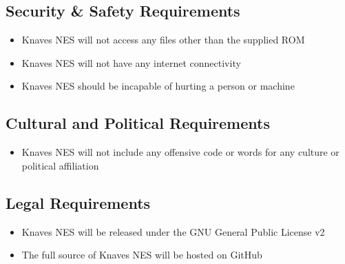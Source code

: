 \documentclass[12pt]{article}
\begin{document}
	\subsection{Security \& Safety Requirements}
		\begin{itemize}
			\item Knaves NES will not access any files other than the supplied ROM
			\item Knaves NES will not have any internet connectivity
			\item Knaves NES should be incapable of hurting a person or machine
		\end{itemize}
	\subsection{Cultural and Political Requirements}
		\begin{itemize}
			\item Knaves NES will not include any offensive code or words for any culture or political affiliation
		\end{itemize}
	\subsection{Legal Requirements}
		\begin{itemize}
			\item Knaves NES will be released under the GNU General Public License v2
			\item The full source of Knaves NES will be hosted on GitHub
		\end{itemize}
\end{document}
